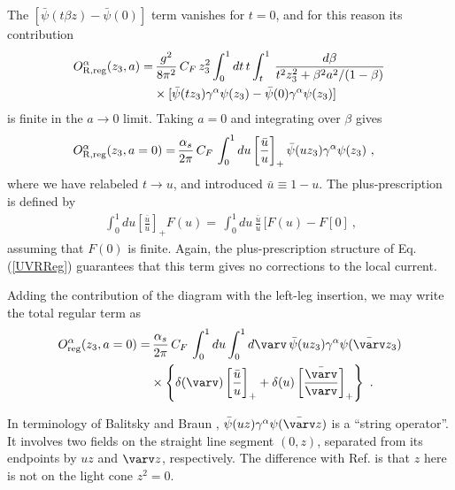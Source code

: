 \documentclass[final,5p,times,twocolumn]{elsarticle}
\newcommand{\nn}{\nonumber \\ }
\begin{document}
  
The $ \left [ \bar  \psi (t \beta z)  -  \bar  \psi (0) \right ]$ term vanishes for $t=0$, and for this reason its  contribution
    \begin{align} 
   O^\alpha_{\rm R,reg}  (z_3,a) = &    \,        \frac{ g^2}{8 \pi^2} \, C_F\, z_3^2
\int_0^1  dt \, t    
   \int_t^1 \, \frac{  d \beta }{t^2z_3^2 +\beta^2 a^2/(1-\beta) } \,    \nonumber \\ &  \times 
   [ \bar \psi (t z_3 )    \gamma^\alpha  \psi (z_3) - \bar \psi (0 )  \gamma^\alpha  \psi (z_3)]
     \
    \label{UVareg}
 \end{align}
 is finite in the $a\to 0$ limit.   Taking $a=0$  
  and integrating over $\beta$  gives 
  \begin{align} 
  O^\alpha_{\rm R,reg}  (z_3, a=0) = &    \,     \frac{ \alpha_s}{2\pi} \, C_F
 \,\int_0^1  du \left[ \frac{\bar u }{u }\right ] _+ 
  \bar \psi (uz_3) \gamma^\alpha \psi (z_3)
     \ ,
    \label{UVRReg}
 \end{align}
 where we  have relabeled $t \to u$, and  introduced  $\bar u \equiv 1-u$. The plus-prescription is defined by
   \begin{align} 
 \,\int_0^1  du \left[ \frac{\bar u }{u }\right ] _+  F(u)  =    \,\int_0^1  du \, \frac{\bar u }{u } \,  [F(u)-F[0] \ ,
    \label{Plus}
 \end{align}
 assuming that $F(0)$ is finite.
Again, the plus-prescription structure  of Eq. (\ref{UVRReg})
guarantees that this term   gives no corrections to the local current.
 
Adding  the contribution of the diagram with the left-leg insertion, we may write
the total regular term as 
    \begin{align} 
  O^\alpha_{\rm reg}  (z_3, a=0) = &    \,     \frac{ \alpha_s}{2\pi} \, C_F
 \,\int_0^1  du \int_0^1  d\varv \, \bar \psi (uz_3) \gamma^\alpha \psi (\bar \varv z_3) 
  \nn & \times  \left \{ \delta (\varv) \left[ \frac{\bar u }{u }\right ] _+
 + \delta (u) \left[ \frac{\bar \varv }{\varv }\right ] _+   \right \}  %
     \ .
    \label{gauge24}
 \end{align}
 
 In terminology of Balitsky and Braun  \cite{Balitsky:1987bk},   $\bar \psi (uz) \gamma^\alpha \psi (\bar \varv z) $
 is a ``string operator''.  It involves two fields on the straight line segment  $(0,z)$,  separated 
from its endpoints  by $uz$ and   $\varv z$, respectively. The difference with  Ref. \cite{Balitsky:1987bk} is that  
 $z$  here   is not  on the light cone $z^2=0$.
 
\end{document}
